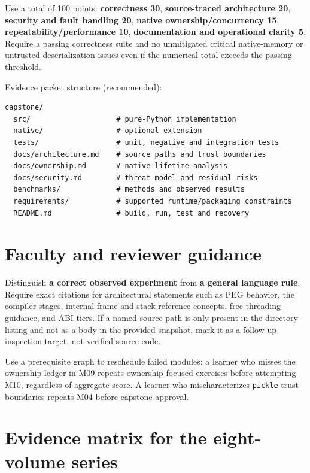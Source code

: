 \documentclass[
  11pt,
]{report}
\newcommand{\passthrough}[1]{#1}
\begin{document}
Use a total of 100 points: \textbf{correctness 30},
\textbf{source-traced architecture 20}, \textbf{security and fault
handling 20}, \textbf{native ownership/concurrency 15},
\textbf{repeatability/performance 10}, \textbf{documentation and
operational clarity 5}. Require a passing correctness suite and no
unmitigated critical native-memory or untrusted-deserialization issues
even if the numerical total exceeds the passing threshold.

Evidence packet structure (recommended):

\begin{lstlisting}
capstone/
  src/                    # pure-Python implementation
  native/                 # optional extension
  tests/                  # unit, negative and integration tests
  docs/architecture.md    # source paths and trust boundaries
  docs/ownership.md       # native lifetime analysis
  docs/security.md        # threat model and residual risks
  benchmarks/             # methods and observed results
  requirements/           # supported runtime/packaging constraints
  README.md               # build, run, test and recovery
\end{lstlisting}

\chapter{Faculty and reviewer
guidance}\label{faculty-and-reviewer-guidance}

Distinguish \textbf{a correct observed experiment} from \textbf{a
general language rule}. Require exact citations for architectural
statements such as PEG behavior, the compiler stages, internal frame and
stack-reference concepts, free-threading guidance, and ABI tiers. If a
named source path is only present in the directory listing and not as a
body in the provided snapshot, mark it as a follow-up inspection target,
not verified source code.

Use a prerequisite graph to reschedule failed modules: a learner who
misses the ownership ledger in M09 repeats ownership-focused exercises
before attempting M10, regardless of aggregate score. A learner who
mischaracterizes \passthrough{\lstinline!pickle!} trust boundaries
repeats M04 before capstone approval.

\chapter{Evidence matrix for the eight-volume
series}\label{evidence-matrix-for-the-eight-volume-series}
\end{document}
